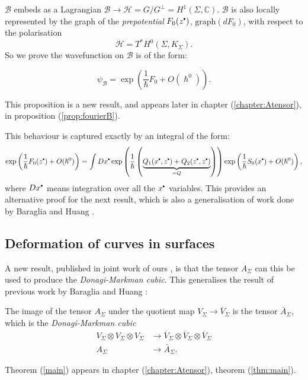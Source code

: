     \( \mathcal{B}\) embeds as a Lagrangian \(\mathcal{B} \rightarrow \mathcal{H} =G/G^{\perp} = H^1(\Sigma, \mathbb{C})\). \(\mathcal{B}\) is also locally represented by the graph of the \emph{prepotential} \( F_0(z^{\sbt})\), \( \mathrm{graph}(d F_0)\), with respect to the polarisation 
    \[ \mathcal{H} = T^* H^0( \Sigma, K_\Sigma ). \]
    So we prove the wavefunction on \( \mathcal{B}\) is of the form:
    \begin{prop}
    \begin{equation} 
    \psi_{\mathcal{B}} = \exp\left( \frac{1}{\hslash} F_0 + O(\hslash^0) \right).
    \end{equation}
    \end{prop}
    This proposition is a new result, and appears later in chapter (\ref{chapter:Atensor}), in proposition (\ref{prop:fourierB}).
    
    This behaviour is captured exactly by an integral of the form:
    \[ \exp\left( \frac{1}{\hslash} F_0(z^{\sbt}) + O(\hslash^0) \right) = \int Dx^{\sbt} \exp\left( \frac{1}{\hslash} \left( \underbrace{Q_1(x^{\sbt},z^{\sbt}) + Q_2(z^{\sbt},z^{\sbt})}_{=Q}\right)\right) \exp\left( \frac{1}{\hslash} S_0(x^{\sbt}) + O(\hslash^0)\right),\]
    where \( Dx^{\sbt}\) means integration over all the \(x^{\sbt}\) variables. This provides an alternative proof for the next result, which is also a generalisation of work done by Baraglia and Huang \cite{bhuespe}.

    \subsection{Deformation of curves in surfaces}

    
    A new result, published in joint work of ours \cite{chaimanowong2020airy}, is that the tensor \(A_\Sigma\) can this be used to produce the \emph{Donagi-Markman cubic}. This generalises the result of previous work by Baraglia and Huang \cite{bhuespe}:

    \begin{thm}  \label{main}
    The image of the tensor \(A_\Sigma\) under the quotient map \(V_\Sigma \rightarrow \overline{V}_\Sigma\) is the tensor \(\bar{A}_\Sigma\), which is the \emph{Donagi-Markman cubic}
    \begin{align}  \label{tensquot}
        V_\Sigma\otimes V_\Sigma\otimes V_\Sigma& \longrightarrow\overline{V}_\Sigma\otimes\overline{V}_\Sigma\otimes\overline{V}_\Sigma\\
    A_\Sigma& \longrightarrow \bar{A}_\Sigma.\nonumber
    \end{align}
    \end{thm}
    Theorem (\ref{main}) appears in chapter (\ref{chapter:Atensor}), theorem (\ref{thm:main}).
    
